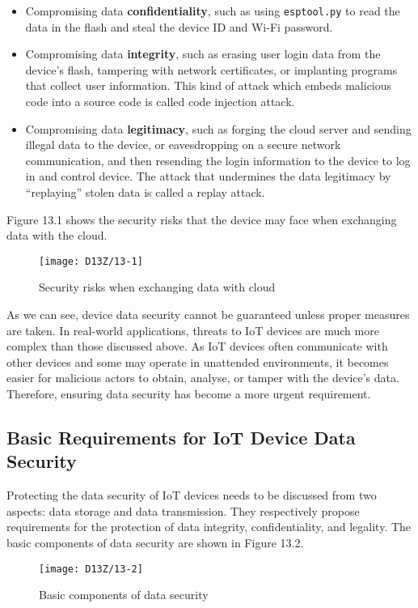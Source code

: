 \documentclass[a4paper,12pt]{book}
\begin{document}
\begin{itemize}
    \item  Compromising data \textbf{confidentiality}, such as using \verb|esptool.py| to read the data in the flash and steal the device ID and Wi-Fi password.
    \item Compromising data \textbf{integrity}, such as erasing user login data from the device’s flash, tampering with network certificates, or implanting programs that collect user information. This kind of attack which embeds malicious code into a source code is called code injection attack.
    \item Compromising data \textbf{legitimacy}, such as forging the cloud server and sending illegal data to the device, or eavesdropping on a secure network communication, and then resending the login information to the device to log in and control device. The attack that undermines the data legitimacy by “replaying” stolen data is called a replay attack.
\end{itemize}

Figure 13.1 shows the security risks that the device may face when exchanging data with the cloud.

\begin{figure}[!h]
    \centering
    \texttt{[image: D13Z/13-1]}
    \caption{Security risks when exchanging data with cloud}
\end{figure}

As we can see, device data security cannot be guaranteed unless proper measures are taken. In real-world applications, threats to IoT devices are much more complex than those discussed above. As IoT devices often communicate with other devices and some may operate in unattended environments, it becomes easier for malicious actors to obtain, analyse, or tamper with the device's data. Therefore, ensuring data security has become a more urgent requirement.

\subsection{Basic Requirements for IoT Device Data Security}
Protecting the data security of IoT devices needs to be discussed from two aspects: data storage and data transmission. They respectively propose requirements for the protection of data integrity, confidentiality, and legality. The basic components of data security are shown in Figure 13.2.

\begin{figure}[!h]
    \centering
    \texttt{[image: D13Z/13-2]}
    \caption{Basic components of data security}
\end{figure}
\end{document}
